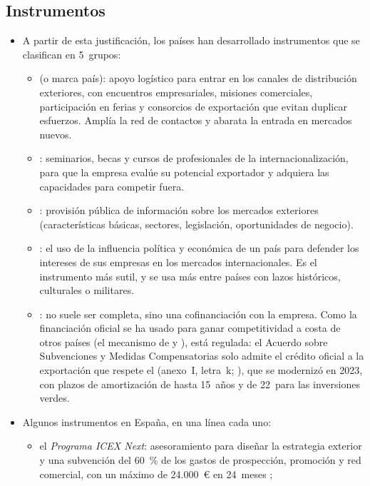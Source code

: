 \documentclass[11pt]{article}
\begin{document}
\subsection{Instrumentos}\label{sec:instrumentos}

\begin{itemize}
\item A partir de esta justificación, los países han desarrollado instrumentos que se clasifican en 5~grupos:
  \begin{itemize}
  \item {} (o marca país): apoyo logístico para entrar en los canales de distribución exteriores, con encuentros empresariales, misiones comerciales, participación en ferias y consorcios de exportación que evitan duplicar esfuerzos. Amplía la red de contactos y abarata la entrada en mercados nuevos.
  \item {}: seminarios, becas y cursos de profesionales de la internacionalización, para que la empresa evalúe su potencial exportador y adquiera las capacidades para competir fuera.
  \item {}: provisión pública de información sobre los mercados exteriores (características básicas, sectores, legislación, oportunidades de negocio).
  \item {}: el uso de la influencia política y económica de un país para defender los intereses de sus empresas en los mercados internacionales. Es el instrumento más sutil, y se usa más entre países con lazos históricos, culturales o militares.
  \item {}: no suele ser completa, sino una cofinanciación con la empresa. Como la financiación oficial se ha usado para ganar competitividad a costa de otros países (el mecanismo de  y ), está regulada: el Acuerdo sobre Subvenciones y Medidas Compensatorias solo admite el crédito oficial a la exportación que respete el  (anexo~I, letra~k; \cite{OMC1994SMC}), que se modernizó en 2023, con plazos de amortización de hasta 15~años y de 22~para las inversiones verdes\nocite{MayerBrown2023Arrangement}.
  \end{itemize}
\item Algunos instrumentos en España, en una línea cada uno:
  \begin{itemize}
  \item el \emph{Programa ICEX Next}: asesoramiento para diseñar la estrategia exterior y una subvención del 60~\% de los gastos de prospección, promoción y red comercial, con un máximo de 24.000~€ en 24~meses\nocite{ICEX2026Next} ;

\end{itemize}
\end{itemize}
\end{document}
